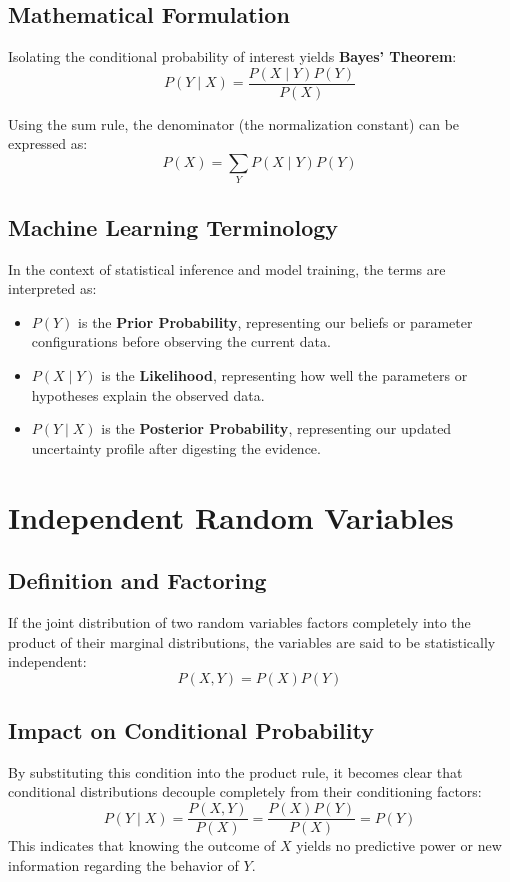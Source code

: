 \documentclass[11pt,a4paper]{article}
\begin{document}
\subsection{Mathematical Formulation}
Isolating the conditional probability of interest yields \textbf{Bayes' Theorem}:
\begin{equation}
P(Y \mid X) = \frac{P(X \mid Y)P(Y)}{P(X)}
\end{equation}

Using the sum rule, the denominator (the normalization constant) can be expressed as:
\begin{equation}
P(X) = \sum_{Y} P(X \mid Y)P(Y)
\end{equation}

\subsection{Machine Learning Terminology}
In the context of statistical inference and model training, the terms are interpreted as:
\begin{itemize}
    \item $P(Y)$ is the \textbf{Prior Probability}, representing our beliefs or parameter configurations before observing the current data.
    \item $P(X \mid Y)$ is the \textbf{Likelihood}, representing how well the parameters or hypotheses explain the observed data.
    \item $P(Y \mid X)$ is the \textbf{Posterior Probability}, representing our updated uncertainty profile after digesting the evidence.
\end{itemize}

\section{Independent Random Variables}
\subsection{Definition and Factoring}
If the joint distribution of two random variables factors completely into the product of their marginal distributions, the variables are said to be statistically independent:
\begin{equation}
P(X, Y) = P(X)P(Y)
\end{equation}

\subsection{Impact on Conditional Probability}
By substituting this condition into the product rule, it becomes clear that conditional distributions decouple completely from their conditioning factors:
\begin{equation}
P(Y \mid X) = \frac{P(X, Y)}{P(X)} = \frac{P(X)P(Y)}{P(X)} = P(Y)
\end{equation}
This indicates that knowing the outcome of $X$ yields no predictive power or new information regarding the behavior of $Y$.
\end{document}
